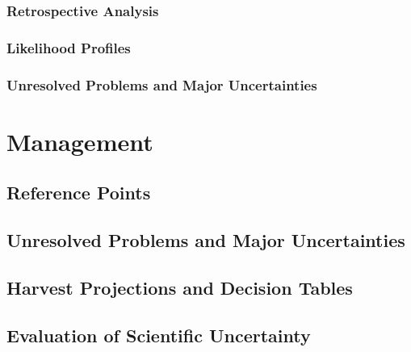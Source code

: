 \documentclass[11pt,
  letterpaper,
]{article}
\begin{document}
\hypertarget{retrospective-analysis}{%
\subsubsection{Retrospective Analysis}\label{retrospective-analysis}}

\hypertarget{likelihood-profiles}{%
\subsubsection{Likelihood Profiles}\label{likelihood-profiles}}

\hypertarget{unresolved-problems-and-major-uncertainties-1}{%
\subsubsection{Unresolved Problems and Major Uncertainties}\label{unresolved-problems-and-major-uncertainties-1}}

\hypertarget{management}{%
\section{Management}\label{management}}

\hypertarget{reference-points-2}{%
\subsection{Reference Points}\label{reference-points-2}}

\hypertarget{unresolved-problems-and-major-uncertainties-2}{%
\subsection{Unresolved Problems and Major Uncertainties}\label{unresolved-problems-and-major-uncertainties-2}}

\hypertarget{harvest-projections-and-decision-tables}{%
\subsection{Harvest Projections and Decision Tables}\label{harvest-projections-and-decision-tables}}

\hypertarget{evaluation-of-scientific-uncertainty}{%
\subsection{Evaluation of Scientific Uncertainty}\label{evaluation-of-scientific-uncertainty}}
\end{document}
